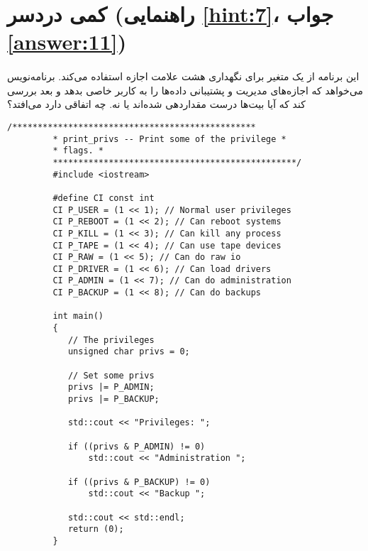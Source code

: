 \section[کمی دردسر]{کمی دردسر \protect{} (راهنمایی \ref{hint:7}، جواب \ref{answer:11})}
\paragraph{}\label{prog:30}
این برنامه از یک متغیر برای نگهداری هشت علامت اجازه استفاده می‌کند. برنامه‌نویس می‌خواهد که اجازه‌های مدیریت  و پشتیبانی داده‌ها  را به کاربر خاصی بدهد و بعد بررسی کند که آیا بیت‌ها درست مقداردهی شده‌اند یا نه. چه اتفاقی دارد می‌افتد؟

\begin{LTR}
    \begin{lstlisting}[style=C++Style]
         /************************************************
         * print_privs -- Print some of the privilege *
         * flags. *
         ************************************************/
         #include <iostream>

         #define CI const int
         CI P_USER = (1 << 1); // Normal user privileges
         CI P_REBOOT = (1 << 2); // Can reboot systems
         CI P_KILL = (1 << 3); // Can kill any process
         CI P_TAPE = (1 << 4); // Can use tape devices
         CI P_RAW = (1 << 5); // Can do raw io
         CI P_DRIVER = (1 << 6); // Can load drivers
         CI P_ADMIN = (1 << 7); // Can do administration
         CI P_BACKUP = (1 << 8); // Can do backups

         int main()
         {
         	// The privileges
         	unsigned char privs = 0;

         	// Set some privs
         	privs |= P_ADMIN;
         	privs |= P_BACKUP;

         	std::cout << "Privileges: ";

         	if ((privs & P_ADMIN) != 0)
         		std::cout << "Administration ";

         	if ((privs & P_BACKUP) != 0)
         		std::cout << "Backup ";

         	std::cout << std::endl;
         	return (0);
         }
    \end{lstlisting}
\end{LTR}